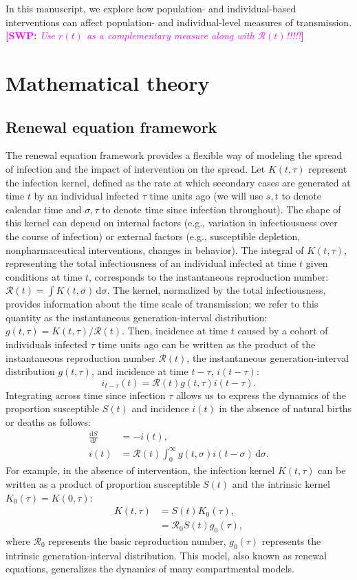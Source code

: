 \documentclass[12pt]{article}
\newcommand{\comment}{\showcomment}
\newcommand{\showcomment}[3]{\textcolor{#1}{\textbf{[#2: }\textsl{#3}\textbf{]}}}
\newcommand{\swp}[1]{\comment{magenta}{SWP}{#1}}
\newcommand{\Rx}[1]{\ensuremath{{\mathcal R}_{#1}}\xspace}
\newcommand{\Ro}{\Rx{0}}
\newcommand{\RR}{\ensuremath{{\mathcal R}}\xspace}
\newcommand{\dd}[1]{\ensuremath{\, \mathrm{d}#1}}
\newcommand{\dsigma}{\dd{\sigma}}
\begin{document}
In this manuscript, we explore how population- and individual-based interventions can affect population- and individual-level measures of transmission.
\swp{Use $r(t)$ as a complementary measure along with $\RR(t)$!!!!!}

\section{Mathematical theory}

\subsection{Renewal equation framework}

The renewal equation framework provides a flexible way of modeling the spread of infection and the impact of intervention on the spread.
Let $K(t, \tau)$ represent the infection kernel, defined as the rate at which secondary cases are generated at time $t$ by an individual infected $\tau$ time units ago (we will use $s, t$ to denote calendar time and $\sigma, \tau$ to denote time since infection throughout).
The shape of this kernel can depend on internal factors (e.g., variation in infectiousness over the course of infection) or external factors (e.g., susceptible depletion, nonpharmaceutical interventions, changes in behavior).
The integral of $K(t, \tau)$, representing the total infectiousness of an individual infected at time $t$ given conditions at time $t$, corresponds to the instantaneous reproduction number: $\RR(t) = \int K(t, \sigma) \dsigma$.
The kernel, normalized by the total infectiousness, provides information about the time scale of transmission; we refer to this quantity as the instantaneous generation-interval distribution: $g(t, \tau) = K(t, \tau)/\RR(t)$.
Then, incidence at time $t$ caused by a cohort of individuals infected $\tau$ time units ago can be written as the product of the instantaneous reproduction number $\RR(t)$, the instantaneous generation-interval distribution $g(t, \tau)$, and incidence at time $t-\tau$, $i(t-\tau)$:
\begin{equation}
i_{t-\tau}(t) = \RR(t) g(t, \tau) i(t-\tau).
\end{equation}
Integrating across time since infection $\tau$ allows us to express the dynamics of the proportion susceptible $S(t)$ and incidence $i(t)$ in the absence of natural births or deaths as follows: 
\begin{align}
\frac{\mathrm{d}S}{\mathrm{d}t} &= - i(t),\\
i(t) &= \RR(t) \int_0^\infty  g(t, \sigma) i(t-\sigma) \dsigma.
\label{eq:renewal}
\end{align}
For example, in the absence of intervention, the infection kernel $K(t, \tau)$ can be written as a product of proportion susceptible $S(t)$ and the intrinsic kernel $K_0(\tau) = K(0, \tau)$:
\begin{align}
K(t, \tau) &= S(t) K_0(\tau),\\
&= \Ro S(t) g_0(\tau),
\end{align}
where $\Ro$ represents the basic reproduction number, $g_0(\tau)$ represents the intrinsic generation-interval distribution.
This model, also known as renewal equations, generalizes the dynamics of many compartmental models.
\end{document}
